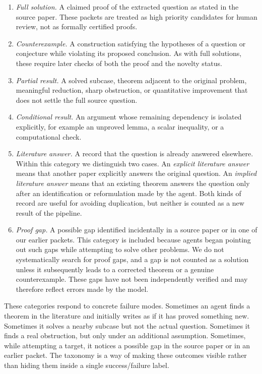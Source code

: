 \documentclass[11pt,reqno]{amsart}
\theoremstyle{plain}
\theoremstyle{definition}
\begin{document}
\begin{enumerate}[label=\emph{(\roman*)}, leftmargin=2em]
\item \emph{Full solution.}  A claimed proof of the extracted question as stated in the source paper.  These packets are treated as high priority candidates for human review, not as formally certified proofs.

\item \emph{Counterexample.}  A construction satisfying the hypotheses of a question or conjecture while violating its proposed conclusion.  As with full solutions, these require later checks of both the proof and the novelty status.

\item \emph{Partial result.}  A solved subcase, theorem adjacent to the original problem, meaningful reduction, sharp obstruction, or quantitative improvement that does not settle the full source question.

\item \emph{Conditional result.}  An argument whose remaining dependency is isolated explicitly, for example an unproved lemma, a scalar inequality, or a computational check.

\item \emph{Literature answer.}  A record that the question is already answered elsewhere.  Within this category we distinguish two cases.  An \emph{explicit literature answer} means that another paper explicitly answers the original question.  An \emph{implied literature answer} means that an
existing theorem answers the question only after an identification or reformulation made by the agent.  Both kinds of record are useful for avoiding duplication, but neither is counted as a new result of the pipeline.

\item \emph{Proof gap.} A possible gap identified incidentally in a source paper or in one of our earlier packets. This category is included because agents began pointing out such gaps while attempting to solve other problems. We do not systematically search for proof gaps, and a gap is not counted as a solution unless it subsequently leads to a corrected theorem or a genuine counterexample. These gaps have not been independently verified and may therefore reflect errors made by the model.
\end{enumerate}

These categories respond to concrete failure modes. Sometimes an agent finds a theorem in the literature and initially writes as if it has proved something new.  Sometimes it solves a nearby subcase but not the actual question.  Sometimes it finds a real obstruction, but only under an additional assumption.  Sometimes, while attempting a target, it notices a possible gap in
the source paper or in an earlier packet.  The taxonomy is a way of making these outcomes visible rather than hiding them inside a single success/failure
label.
\end{document}
